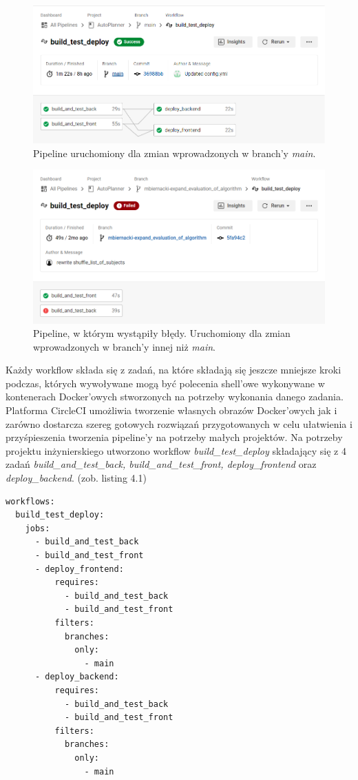 \begin{figure}[H]
\centering\includegraphics[width=\textwidth]{figures/ppl_flow}
\caption{Pipeline uruchomiony dla zmian wprowadzonych w branch'y \textit{main}.}
\end{figure}

\begin{figure}[H]
\centering\includegraphics[width=\textwidth]{figures/ppl_flow_fail}
\caption{Pipeline, w którym wystąpiły błędy. Uruchomiony dla zmian wprowadzonych w branch'y innej niż \textit{main}.}
\end{figure}

	Każdy workflow składa się z zadań, na które składają się jeszcze mniejsze kroki podczas, których wywoływane mogą być polecenia shell'owe wykonywane w kontenerach Docker'owych stworzonych na potrzeby wykonania danego zadania. Platforma CircleCI umożliwia tworzenie własnych obrazów Docker'owych jak i zarówno dostarcza szereg gotowych rozwiązań przygotowanych w celu ułatwienia i przyśpieszenia tworzenia pipeline'y na potrzeby małych projektów. Na potrzeby projektu inżynierskiego utworzono workflow \textit{build\_test\_deploy} składający się z 4 zadań \textit{build\_and\_test\_back, build\_and\_test\_front, deploy\_frontend} oraz \textit{deploy\_backend}. (zob. listing 4.1) 
\begin{lstlisting}[caption=Część skryptu config.yml odpowiedzialna za określenie przebiegu workflow'u.]
workflows:
  build_test_deploy:
    jobs:
      - build_and_test_back
      - build_and_test_front
      - deploy_frontend:
          requires:
            - build_and_test_back
            - build_and_test_front
          filters:
            branches:
              only:
                - main
      - deploy_backend:
          requires:
            - build_and_test_back
            - build_and_test_front
          filters:
            branches:
              only:
                - main
\end{lstlisting} 


